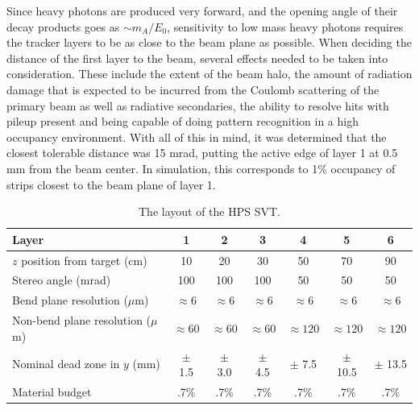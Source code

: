 Since heavy photons are produced very forward, and the opening angle of their 
decay products goes as $\sim m_{A}/E_{0}$, sensitivity to low mass heavy photons
requires
the tracker layers to be as close to the beam plane as possible.  When deciding
the distance of the first layer to the beam, several effects needed to be taken
into consideration. These include the extent of the beam halo, the amount of 
radiation damage that is expected to be incurred from the Coulomb scattering
of the primary beam as well as radiative secondaries, the ability to resolve 
hits with pileup present and being capable of doing pattern recognition in a high 
occupancy environment.  With all of this in mind, it was determined that the 
closest tolerable distance was 15 mrad, putting the active edge of layer 1 
at 0.5 mm from the beam center. In simulation, this corresponds to 1\% occupancy
of strips closest to the beam plane of layer 1.


\begin{table}
    \centering
    \begin{tabular}{lcccccc}  
        \toprule
        \textbf{Layer} & \textbf{1} & \textbf{2} & \textbf{3} & \textbf{4} & \textbf{5} & \textbf{6} \\
        \midrule
        \midrule
        $z$ position from target (cm)    & 10 & 20 & 30 & 50 & 70 & 90 \\
        Stereo angle (mrad) & 100 & 100 & 100 & 50 & 50 & 50 \\
        Bend plane resolution ($\mu$m) & $\approx$6 & $\approx$6 & $\approx$6 & $\approx$6 & $\approx$6 & $\approx$6 \\
        Non-bend plane resolution ($\mu$m) & $\approx60$ & $\approx60$ & $\approx60$ & $\approx120$ & $\approx120$ & $\approx120$ \\
        Nominal dead zone in $y$ (mm) & $\pm$ 1.5 & $\pm$ 3.0 & $\pm$ 4.5 & $\pm$ 7.5 & $\pm$ 10.5 & $\pm$ 13.5 \\ 
        Material budget & .7\% & .7\% & .7\% & .7\% & .7\% & .7\% \\
        \bottomrule
    \end{tabular}
    \caption{The layout of the HPS SVT.}
    \label{tab:svt_layout}
\end{table}

